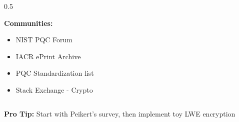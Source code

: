 \documentclass[aspectratio=169,10pt]{beamer}
\newcommand{\teaching}[1]{}
\theoremstyle{plain}
\begin{document}
\begin{frame}
\begin{columns}[T]
\begin{column}{0.5\textwidth}
    \vspace{0.3cm}
    
    \textbf{Communities:}
    \begin{itemize}
      \item NIST PQC Forum
      \item IACR ePrint Archive
      \item PQC Standardization list
      \item Stack Exchange - Crypto
    \end{itemize}
  
    \end{column}
  \end{columns}
  
  \vspace{0.5cm}
  
  \begin{blueBox}
    \textbf{Pro Tip:} Start with Peikert's survey, then implement toy LWE encryption
  \end{blueBox}
  
  \teaching{Enable continued self-learning}
\end{frame}
\end{document}
